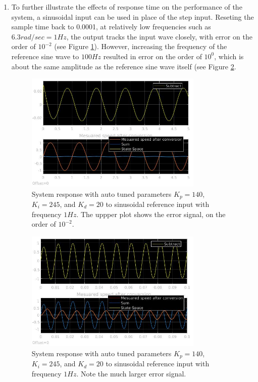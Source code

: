 \documentclass{journal}
\begin{document}
\begin{enumerate}[label=(\alph*)]
	\item %
	To further illustrate the effects of response time on the performance of the system, a sinusoidal input can be used in place of the step input.  Reseting the sample time back to 0.0001, at relatively low frequencies such as $6.3 rad/sec = 1 Hz$, the output tracks the input wave closely, with error on the order of $10^{-2}$ (see Figure \ref{fig:Lab1PID_1Hz}).  However, increasing the frequency of the reference sine wave to $100Hz$ resulted in error on the order of $10^0$, which is about the same amplitude as the reference sine wave itself (see Figure \ref{fig:Lab1PID_100Hz}.

	\begin{figure}[H]
		\centering
		\includegraphics[width = 0.8\textwidth]{Lab1PID_1Hz.jpg}
		\caption{System response with auto tuned parameters $K_p = 140$, $K_i = 245$, and $K_d = 20$ to sinusoidal reference input with frequency $1Hz$.  The uppper plot shows the error signal, on the order of $10^{-2}$.}
		\label{fig:Lab1PID_1Hz}
	\end{figure}

	\begin{figure}[H]
		\centering
		\includegraphics[width = 0.8\textwidth]{Lab1PID_100Hz.jpg}
		\caption{System response with auto tuned parameters $K_p = 140$, $K_i = 245$, and $K_d = 20$ to sinusoidal reference input with frequency $1Hz$.  Note the much larger error signal.}
		\label{fig:Lab1PID_100Hz}
	\end{figure}


\end{enumerate}
\end{document}
